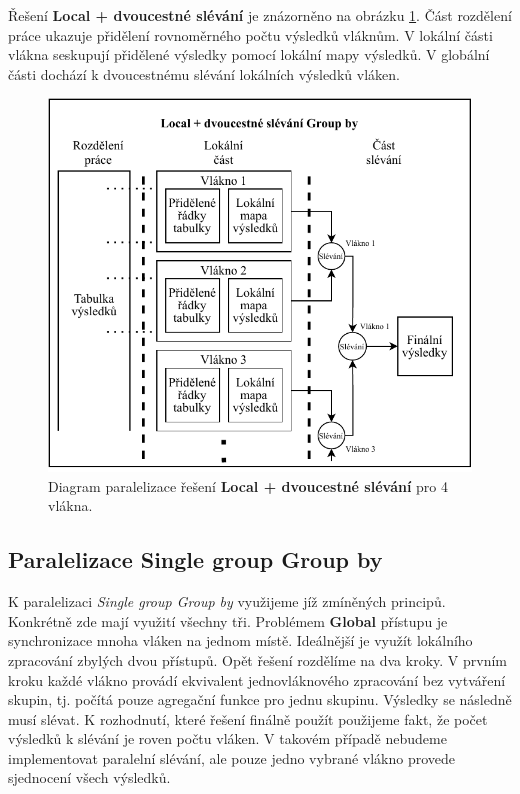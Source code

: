 Řešení \textbf{Local + dvoucestné slévání} je znázorněno na obrázku \ref{figure.diaLocalGr}.
Část rozdělení práce ukazuje přidělení rovnoměrného počtu výsledků vláknům.
V lokální části vlákna seskupují přidělené výsledky pomocí lokální mapy výsledků.
V globální části dochází k dvoucestnému slévání lokálních výsledků vláken.



\begin{figure}[!htp]
\includegraphics{../img/diaLocalGr.pdf}\centering
\caption{Diagram paralelizace řešení \textbf{Local + dvoucestné slévání} pro 4 vlákna.}
\label{figure.diaLocalGr}
\end{figure}

\subsection{Paralelizace Single group Group by} \label{anal.groupby.singlegroup}

K paralelizaci \textit{Single group Group by} využijeme jíž zmíněných principů.
Konkrétně zde mají využití všechny tři.
Problémem \textbf{Global} přístupu je synchronizace mnoha vláken na jednom místě.
Ideálnější je využít lokálního zpracování zbylých dvou přístupů.
Opět řešení rozdělíme na dva kroky. 
V prvním kroku každé vlákno provádí ekvivalent jednovláknového zpracování bez vytváření skupin, tj. počítá pouze agregační funkce pro jednu skupinu.
Výsledky se následně musí slévat.
K rozhodnutí, které řešení finálně použít použijeme fakt, že počet výsledků k slévání je roven počtu vláken.
V takovém případě nebudeme implementovat paralelní slévání, ale pouze jedno vybrané vlákno provede sjednocení všech výsledků.


